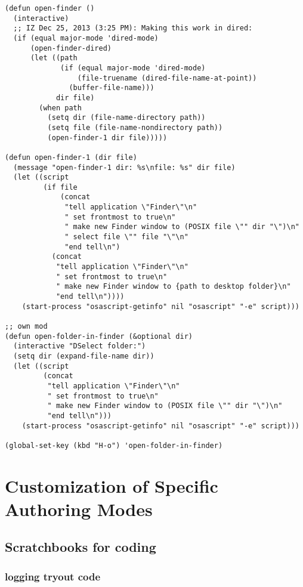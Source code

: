 \documentclass{article}
\begin{document}
\begin{verbatim}
(defun open-finder ()
  (interactive)
  ;; IZ Dec 25, 2013 (3:25 PM): Making this work in dired:
  (if (equal major-mode 'dired-mode)
      (open-finder-dired)
      (let ((path
             (if (equal major-mode 'dired-mode)
                 (file-truename (dired-file-name-at-point))
               (buffer-file-name)))
            dir file)
        (when path
          (setq dir (file-name-directory path))
          (setq file (file-name-nondirectory path))
          (open-finder-1 dir file)))))

(defun open-finder-1 (dir file)
  (message "open-finder-1 dir: %s\nfile: %s" dir file)
  (let ((script
         (if file
             (concat
              "tell application \"Finder\"\n"
              " set frontmost to true\n"
              " make new Finder window to (POSIX file \"" dir "\")\n"
              " select file \"" file "\"\n"
              "end tell\n")
           (concat
            "tell application \"Finder\"\n"
            " set frontmost to true\n"
            " make new Finder window to {path to desktop folder}\n"
            "end tell\n"))))
    (start-process "osascript-getinfo" nil "osascript" "-e" script)))

;; own mod
(defun open-folder-in-finder (&optional dir)
  (interactive "DSelect folder:")
  (setq dir (expand-file-name dir))
  (let ((script
         (concat
          "tell application \"Finder\"\n"
          " set frontmost to true\n"
          " make new Finder window to (POSIX file \"" dir "\")\n"
          "end tell\n")))
    (start-process "osascript-getinfo" nil "osascript" "-e" script)))

(global-set-key (kbd "H-o") 'open-folder-in-finder)
\end{verbatim}

\section{Customization of Specific Authoring Modes}
\label{sec-2}

\subsection{Scratchbooks for coding}
\label{sec-2-1}
\subsubsection{logging tryout code}
\label{sec-2-1-1}
\end{document}
